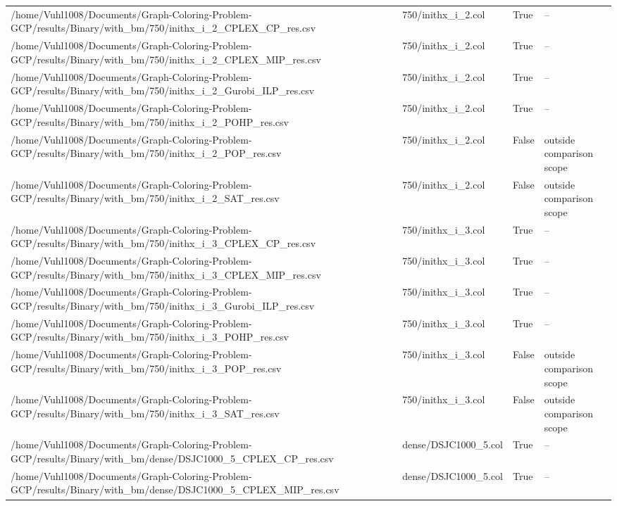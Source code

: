 \begin{table}[htbp]
\begin{tabular}{llll}
/home/Vuhl1008/Documents/Graph-Coloring-Problem-GCP/results/Binary/with\_bm/750/inithx\_i\_2\_CPLEX\_CP\_res.csv & 750/inithx\_i\_2.col & True & -- \\
/home/Vuhl1008/Documents/Graph-Coloring-Problem-GCP/results/Binary/with\_bm/750/inithx\_i\_2\_CPLEX\_MIP\_res.csv & 750/inithx\_i\_2.col & True & -- \\
/home/Vuhl1008/Documents/Graph-Coloring-Problem-GCP/results/Binary/with\_bm/750/inithx\_i\_2\_Gurobi\_ILP\_res.csv & 750/inithx\_i\_2.col & True & -- \\
/home/Vuhl1008/Documents/Graph-Coloring-Problem-GCP/results/Binary/with\_bm/750/inithx\_i\_2\_POHP\_res.csv & 750/inithx\_i\_2.col & True & -- \\
/home/Vuhl1008/Documents/Graph-Coloring-Problem-GCP/results/Binary/with\_bm/750/inithx\_i\_2\_POP\_res.csv & 750/inithx\_i\_2.col & False & outside comparison scope \\
/home/Vuhl1008/Documents/Graph-Coloring-Problem-GCP/results/Binary/with\_bm/750/inithx\_i\_2\_SAT\_res.csv & 750/inithx\_i\_2.col & False & outside comparison scope \\
/home/Vuhl1008/Documents/Graph-Coloring-Problem-GCP/results/Binary/with\_bm/750/inithx\_i\_3\_CPLEX\_CP\_res.csv & 750/inithx\_i\_3.col & True & -- \\
/home/Vuhl1008/Documents/Graph-Coloring-Problem-GCP/results/Binary/with\_bm/750/inithx\_i\_3\_CPLEX\_MIP\_res.csv & 750/inithx\_i\_3.col & True & -- \\
/home/Vuhl1008/Documents/Graph-Coloring-Problem-GCP/results/Binary/with\_bm/750/inithx\_i\_3\_Gurobi\_ILP\_res.csv & 750/inithx\_i\_3.col & True & -- \\
/home/Vuhl1008/Documents/Graph-Coloring-Problem-GCP/results/Binary/with\_bm/750/inithx\_i\_3\_POHP\_res.csv & 750/inithx\_i\_3.col & True & -- \\
/home/Vuhl1008/Documents/Graph-Coloring-Problem-GCP/results/Binary/with\_bm/750/inithx\_i\_3\_POP\_res.csv & 750/inithx\_i\_3.col & False & outside comparison scope \\
/home/Vuhl1008/Documents/Graph-Coloring-Problem-GCP/results/Binary/with\_bm/750/inithx\_i\_3\_SAT\_res.csv & 750/inithx\_i\_3.col & False & outside comparison scope \\
/home/Vuhl1008/Documents/Graph-Coloring-Problem-GCP/results/Binary/with\_bm/dense/DSJC1000\_5\_CPLEX\_CP\_res.csv & dense/DSJC1000\_5.col & True & -- \\
/home/Vuhl1008/Documents/Graph-Coloring-Problem-GCP/results/Binary/with\_bm/dense/DSJC1000\_5\_CPLEX\_MIP\_res.csv & dense/DSJC1000\_5.col & True & -- \\

\end{tabular}
\end{table}
